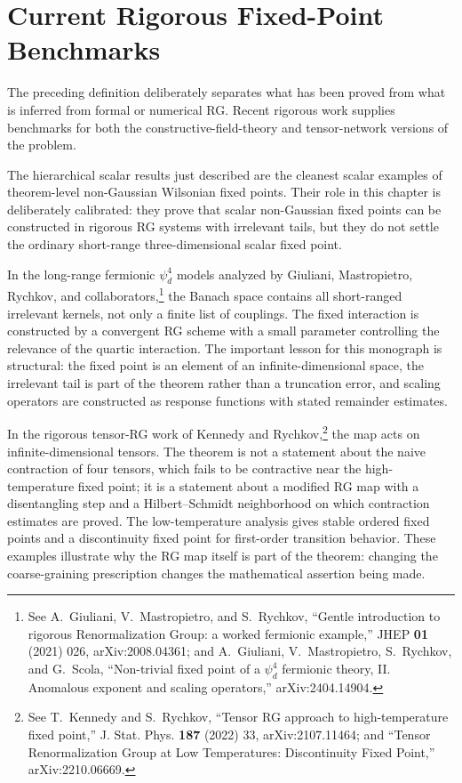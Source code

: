 \section{Current Rigorous Fixed-Point Benchmarks}

The preceding definition deliberately separates what has been proved from
what is inferred from formal or numerical RG.  Recent rigorous work supplies
benchmarks for both the constructive-field-theory and tensor-network
versions of the problem.

The hierarchical scalar results just described are the cleanest scalar
examples of theorem-level non-Gaussian Wilsonian fixed points.  Their role
in this chapter is deliberately calibrated: they prove that scalar
non-Gaussian fixed points can be constructed in rigorous RG systems with
irrelevant tails, but they do not settle the ordinary short-range
three-dimensional scalar fixed point.

In the long-range fermionic \(\psi^4_d\) models analyzed by
Giuliani, Mastropietro, Rychkov, and collaborators,\footnote{See
A.~Giuliani, V.~Mastropietro, and S.~Rychkov, ``Gentle introduction to
rigorous Renormalization Group: a worked fermionic example,''
JHEP \textbf{01} (2021) 026, arXiv:2008.04361; and
A.~Giuliani, V.~Mastropietro, S.~Rychkov, and G.~Scola,
``Non-trivial fixed point of a \(\psi^4_d\) fermionic theory, II. Anomalous
exponent and scaling operators,'' arXiv:2404.14904.}
the Banach space contains all short-ranged irrelevant kernels, not only a
finite list of couplings.  The fixed interaction is constructed by a
convergent RG scheme with a small parameter controlling the relevance of the
quartic interaction.  The important lesson for this monograph is structural:
the fixed point is an element of an infinite-dimensional space, the irrelevant
tail is part of the theorem rather than a truncation error, and scaling
operators are constructed as response functions with stated remainder
estimates.

In the rigorous tensor-RG work of Kennedy and Rychkov,\footnote{See
T.~Kennedy and S.~Rychkov, ``Tensor RG approach to high-temperature fixed
point,'' J. Stat. Phys. \textbf{187} (2022) 33, arXiv:2107.11464; and
``Tensor Renormalization Group at Low Temperatures: Discontinuity Fixed
Point,'' arXiv:2210.06669.}
the map acts on infinite-dimensional tensors.  The theorem is not a statement
about the naive contraction of four tensors, which fails to be contractive
near the high-temperature fixed point; it is a statement about a modified RG
map with a disentangling step and a Hilbert--Schmidt neighborhood on which
contraction estimates are proved.  The low-temperature analysis gives stable
ordered fixed points and a discontinuity fixed point for first-order
transition behavior.  These examples illustrate why the RG map itself is part
of the theorem: changing the coarse-graining prescription changes the
mathematical assertion being made.

